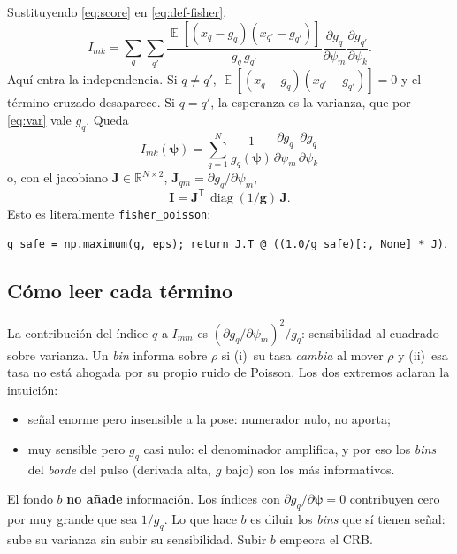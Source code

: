 \documentclass[11pt,a4paper]{article}
\newcommand{\vect}[1]{\boldsymbol{#1}}
\newcommand{\matr}[1]{\mathbf{#1}}
\newcommand{\code}[1]{\texttt{#1}}
\DeclareMathOperator*{\E}{\mathbb{E}}
\DeclareMathOperator{\diag}{diag}
\theoremstyle{definition}
\theoremstyle{plain}
\begin{document}
Sustituyendo \eqref{eq:score} en \eqref{eq:def-fisher},
%
\begin{equation}
I_{mk}
= \sum_q\sum_{q'}
  \frac{\E[(x_q-g_q)(x_{q'}-g_{q'})]}{g_q\,g_{q'}}
  \frac{\partial g_q}{\partial\psi_m}
  \frac{\partial g_{q'}}{\partial\psi_k}.
\end{equation}
%
Aqu\'i entra la independencia. Si $q\neq q'$, $\E[(x_q-g_q)(x_{q'}-g_{q'})]=0$
y el t\'ermino cruzado desaparece. Si $q=q'$, la esperanza es la varianza, que
por \eqref{eq:var} vale $g_q$. Queda
%
\begin{equation}
\label{eq:fisher}
\boxed{\ 
I_{mk}(\vect\psi)
= \sum_{q=1}^{N}
  \frac{1}{g_q(\vect\psi)}
  \frac{\partial g_q}{\partial\psi_m}
  \frac{\partial g_q}{\partial\psi_k}\ }
\end{equation}
%
o, con el jacobiano $\matr J\in\mathbb R^{N\times 2}$,
$\matr J_{qm}=\partial g_q/\partial\psi_m$,
%
\begin{equation}
\label{eq:fisher-mat}
\matr I = \matr J^{\mathsf T}\,\diag(1/\vect g)\,\matr J.
\end{equation}
%
Esto es literalmente \code{fisher\_poisson}:
%
\begin{center}
\code{g\_safe = np.maximum(g, eps);  return J.T @ ((1.0/g\_safe)[:, None] * J)}.
\end{center}

\subsection{C\'omo leer cada t\'ermino}

La contribuci\'on del \'indice $q$ a $I_{mm}$ es
$(\partial g_q/\partial\psi_m)^2 / g_q$: sensibilidad al cuadrado sobre
varianza. Un \emph{bin} informa sobre $\rho$ si (i)~su tasa \emph{cambia} al
mover $\rho$ y (ii)~esa tasa no est\'a ahogada por su propio ruido de Poisson.
Los dos extremos aclaran la intuici\'on:
%
\begin{itemize}[leftmargin=*]
  \item se\~nal enorme pero insensible a la pose: numerador nulo, no aporta;
  \item muy sensible pero $g_q$ casi nulo: el denominador amplifica, y por eso
        los \emph{bins} del \emph{borde} del pulso (derivada alta, $g$ bajo)
        son los m\'as informativos.
\end{itemize}

El fondo $b$ \textbf{no a\~nade} informaci\'on. Los \'indices con
$\partial g_q/\partial\vect\psi=0$ contribuyen cero por muy grande que sea
$1/g_q$. Lo que hace $b$ es diluir los \emph{bins} que s\'i tienen se\~nal:
sube su varianza sin subir su sensibilidad. Subir $b$ empeora el CRB.
\end{document}
